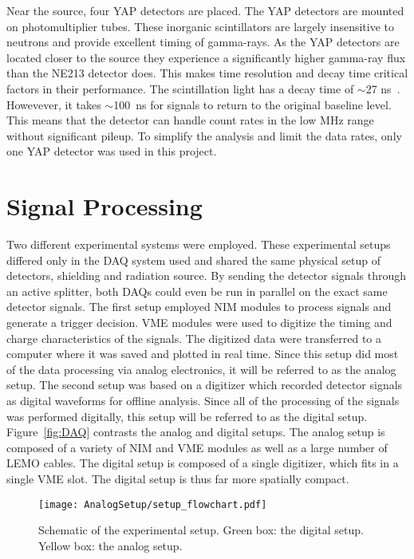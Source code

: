 \documentclass[main.tex]{subfiles}
\begin{document}
Near the source, four YAP detectors are placed. The YAP detectors are mounted on photomultiplier tubes. These inorganic scintillators are largely insensitive to neutrons and provide excellent timing of gamma-rays. As the YAP detectors are located closer to the source they experience a significantly higher gamma-ray flux than the NE213 detector does. This makes time resolution and decay time critical factors in their performance. The scintillation light has a decay time of $\sim$27 ns~\cite{Scionix}. Howevever, it takes $\sim$\SI{100}{ns} for signals to return to the original baseline level. This means that the detector can handle count rates in the low MHz range without significant pileup. To simplify the analysis and limit the data rates, only one YAP detector was used in this project.

\section{Signal Processing}
Two different experimental systems were employed. These experimental setups differed only in the DAQ system used and shared the same physical setup of detectors, shielding and radiation source. By sending the detector signals through an active splitter, both DAQs could even be run in parallel on the exact same detector signals. The first setup employed NIM modules to process signals and generate a trigger decision. VME modules were used to digitize the timing and charge characteristics of the signals. The digitized data were transferred to a computer where it was saved and plotted in real time. Since this setup did most of the data processing via analog electronics, it will be referred to as the analog setup. The second setup was based on a digitizer which recorded detector signals as digital waveforms for offline analysis. Since all of the processing of the signals was performed digitally, this setup will be referred to as the digital setup. Figure~\ref{fig:DAQ} contrasts the analog and digital setups. The analog setup is composed of a variety of NIM and VME modules as well as a large number of LEMO cables. The digital setup is composed of a single digitizer, which fits in a single VME slot. The digital setup is thus far more spatially compact.

\begin{figure}[h]
    \centering
        \texttt{[image: AnalogSetup/setup\_flowchart.pdf]}
        \caption[Schematic of the experimental setup]{Schematic of the experimental setup. Green box: the digital setup. Yellow box: the analog setup.}
    \label{fig:setup}
\end{figure}
\end{document}

